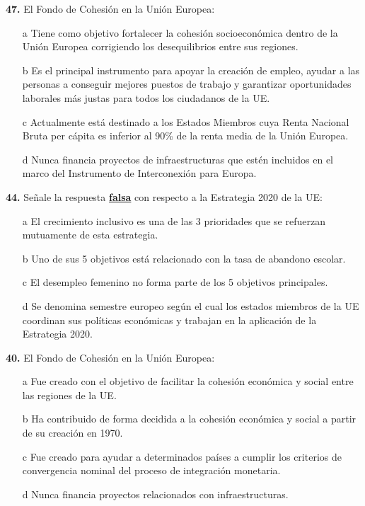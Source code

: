 \documentclass{nuevotema}
\begin{document}
\textbf{47.} El Fondo de Cohesión en la Unión Europea:
\begin{itemize}
	\item[a] Tiene como objetivo fortalecer la cohesión socioeconómica dentro de la Unión Europea corrigiendo los desequilibrios entre sus regiones.
	\item[b] Es el principal instrumento para apoyar la creación de empleo, ayudar a las personas a conseguir mejores puestos de trabajo y garantizar oportunidades laborales más justas para todos los ciudadanos de la UE.
	\item[c] Actualmente está destinado a los Estados Miembros cuya Renta Nacional Bruta per cápita es inferior al 90\% de la renta media de la Unión Europea.
	\item[d] Nunca financia proyectos de infraestructuras que estén incluidos en el marco del Instrumento de Interconexión para Europa.
\end{itemize}

\textbf{44.} Señale la respuesta \textbf{\underline{falsa}} con respecto a la Estrategia 2020 de la UE:
\begin{itemize}
	\item[a] El crecimiento inclusivo es una de las 3 prioridades que se refuerzan mutuamente de esta estrategia.
	\item[b] Uno de sus 5 objetivos está relacionado con la tasa de abandono escolar.
	\item[c] El desempleo femenino no forma parte de los 5 objetivos principales.
	\item[d] Se denomina semestre europeo según el cual los estados miembros de la UE coordinan sus políticas económicas y trabajan en la aplicación de la Estrategia 2020.
\end{itemize}

\textbf{40.} El Fondo de Cohesión en la Unión Europea:
\begin{itemize}
	\item[a] Fue creado con el objetivo de facilitar la cohesión económica y social entre las regiones de la UE.
	\item[b] Ha contribuido de forma decidida a la cohesión económica y social a partir de su creación en 1970.
	\item[c] Fue creado para ayudar a determinados países a cumplir los criterios de convergencia nominal del proceso de integración monetaria.
	\item[d] Nunca financia proyectos relacionados con infraestructuras.
\end{itemize}
\end{document}
